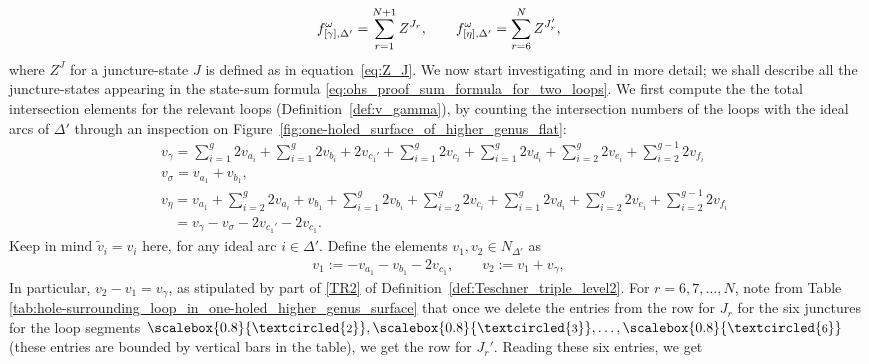 \documentclass[pdftex]{sigma}
\numberwithin{equation}{section}
\theoremstyle{definition}
\newcommand{\circled}[1]{\scalebox{0.8}{\textcircled{\fontsize{8}{9}\selectfont \raisebox{-0.1pt}{#1}}}}
\newcommand{\til}[1]{\widetilde{#1}}
\begin{document}
\begin{align}
\label{eq:ohs_proof_sum_formula_for_two_loops}
f^\omega_{[\gamma],\Delta'} = \sum_{r=1}^{N+1} Z^{J_r}, \qquad
f^\omega_{[\eta],\Delta'} = \sum_{r=6}^{N} Z^{J_r'},\vspace{-1mm}
\end{align}
where $Z^J$ for a juncture-state $J$ is defined as in equation~\eqref{eq:Z_J}.
We now start investigating  and  in more detail; we shall describe all the juncture-states appearing in the state-sum formula \eqref{eq:ohs_proof_sum_formula_for_two_loops}. We first compute the
the total intersection elements for the relevant loops (Definition~\ref{def:v_gamma}), by counting the intersection numbers of the loops with the ideal arcs of $\Delta'$ through an inspection on Figure~\ref{fig:one-holed_surface_of_higher_genus_flat}:\vspace{-1mm}
\begin{align}
\label{eq:ohs_proof_v_gamma}
&{v_\gamma} = \sum^g_{i=1} 2 {v_{a_i}} + \sum^g_{i=1} 2 {v_{b_i}} + 2{v_{c_1'}} + \sum^g_{i=1} 2 {v_{c_i}} + \sum^g_{i=1} 2 {v_{d_i}} + \sum^g_{i=2} 2 {v_{e_i}} + \sum^{g-1}_{i=2} 2 {v_{f_i}} \\[-1mm]
\nonumber
&{v_\sigma} = {v_{a_1}} + {v_{b_1}}, \\[-1mm]
\label{eq:ohs_proof_v_eta1}
&{v_\eta} = {v_{a_1}} + \sum^g_{i=2} 2 {v_{a_i}} + {v_{b_1}} + \sum^g_{i=1} 2 {v_{b_i}} + \sum^g_{i=2} 2 {v_{c_i}} + \sum^g_{i=1} 2 {v_{d_i}} + \sum^g_{i=2} 2 {v_{e_i}} + \sum^{g-1}_{i=2} 2 {v_{f_i}} \\[-1mm]
\label{eq:ohs_proof_v_eta2}
&\phantom{{v_\eta}}{} = {v_\gamma} - {v_\sigma} - 2 {v_{c_1'}} - 2 {v_{c_1}}.
\end{align}
Keep in mind $\til{v}_i=v_i$ here, for any ideal arc $i \in \Delta'$. Define the elements $v_1, v_2 \in N_{\Delta'}$ as
\begin{align}
\label{eq:ohs_proof_v_1_v_2}
v_1 := - v_{a_1} - v_{b_1} - 2v_{c_1}, \qquad
v_2 := v_1 + v_\gamma,
\end{align}
In particular, $v_2 - v_1 = v_\gamma$, as stipulated by part of \ref{TR2} of Definition~\ref{def:Teschner_triple_level2}. For $r=6,7,\dots,N$, note from Table \ref{tab:hole-surrounding_loop_in_one-holed_higher_genus_surface} that once we delete the entries from the row for $J_r$ for the six junctures for the loop segments $\circled{2},\circled{3},\dots,\circled{6}$ (these entries are bounded by vertical bars in the table), we get the row for $J_r'$. Reading these six entries, we get
\end{document}
